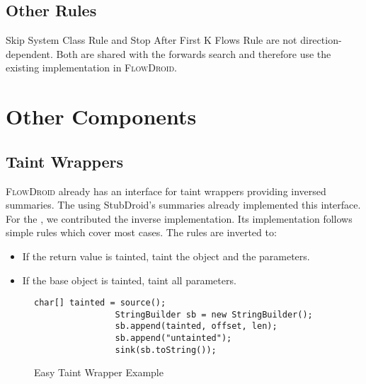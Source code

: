 \documentclass[../draft.tex]{subfiles}
\begin{document}
    \subsection{Other Rules}
    Skip System Class Rule and Stop After First K Flows Rule are not direction-dependent.
    Both are shared with the forwards search and therefore use the existing implementation in \textsc{FlowDroid}.


    \section{Other Components}
    \subsection{Taint Wrappers}\label{s:taintwrapper}
    \textsc{FlowDroid} already has an interface  for taint wrappers providing inversed summaries.
    The  using StubDroid's summaries already implemented this interface.
    For the , we contributed the inverse implementation.
    Its implementation follows simple rules which cover most cases\cite{Arzt2017PhD}.
    The rules are inverted to:
    \begin{itemize}
        \item If the return value is tainted, taint the object and the parameters.
        \item If the base object is tainted, taint all parameters.
    \end{itemize}

    \begin{figure}[tbp]
        \centering
        \begin{adjustbox}{max width=\columnwidth}
            \begin{lstlisting}[gobble=16]
                char[] tainted = source();
                StringBuilder sb = new StringBuilder();
                sb.append(tainted, offset, len);
                sb.append("untainted");
                sink(sb.toString());
            \end{lstlisting}
        \end{adjustbox}
        \caption{Easy Taint Wrapper Example}
        \label{lst:etw}
    \end{figure}
\end{document}
